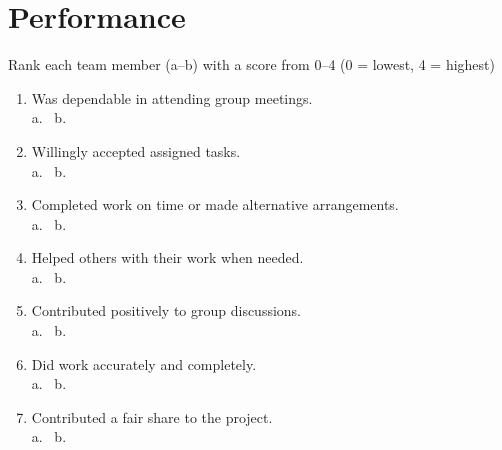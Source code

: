 \documentclass[10pt, letterpaper]{article}
\begin{document}
\section{Performance}
Rank each team member (a--b) with a score from 0--4 (0 = lowest, 4 = highest)
\begin{enumerate}

\item Was dependable in attending group meetings.\\[3ex]
      a. \underline{\hspace{2.35cm}}
      ~b. \underline{\hspace{2.35cm}}

\item Willingly accepted assigned tasks.\\[3ex]
      a. \underline{\hspace{2.35cm}}
      ~b. \underline{\hspace{2.35cm}}

\item Completed work on time or made alternative arrangements.\\[3ex]
      a. \underline{\hspace{2.35cm}}
      ~b. \underline{\hspace{2.35cm}}

\item Helped others with their work when needed.\\[3ex]
      a. \underline{\hspace{2.35cm}}
      ~b. \underline{\hspace{2.35cm}}

\item Contributed positively to group discussions.\\[3ex]
      a. \underline{\hspace{2.35cm}}
      ~b. \underline{\hspace{2.35cm}}

\item Did work accurately and completely.\\[3ex]
      a. \underline{\hspace{2.35cm}}
      ~b. \underline{\hspace{2.35cm}}

\item Contributed a fair share to the project.\\[3ex]
      a. \underline{\hspace{2.35cm}}
      ~b. \underline{\hspace{2.35cm}}


\end{enumerate}
\end{document}
